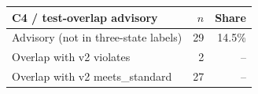 \begin{tabular}{lrr}
\toprule
\textbf{C4 / test-overlap advisory} & \textbf{$n$} & \textbf{Share} \\
\midrule
Advisory (not in three-state labels) & 29 & 14.5\% \\
Overlap with v2 violates & 2 & -- \\
Overlap with v2 meets\_standard & 27 & -- \\
\bottomrule
\end{tabular}
